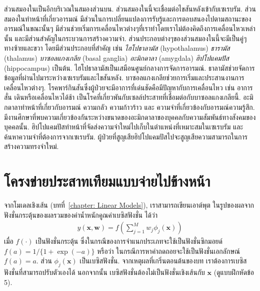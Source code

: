 {\begin{shaded}
ส่วนสมองในเป็นอีกบริเวณในสมองส่วนบน.
ส่วนสมองในนี้จะเชื่อมต่อไขสันหลังเข้ากับเซเรบรัม.
ส่วนสมองในทำหน้าที่เกี่ยวอารมณ์  
มีส่วนในการเปลี่ยนแปลงการรับรู้และการตอบสนองไปตามสถานะของอารมณ์ในขณะนั้นๆ
มีส่วนช่วยเริ่มการเคลื่อนไหวต่างๆที่เราทำโดยเราไม่ต้องคิดถึงการเคลื่อนไหวเหล่านั้น
และมีส่วนสำคัญในกระบวนการสร้างความจำ.
ส่วนประกอบต่างๆของส่วนสมองในนี้จะมีเป็นคู่ๆทางซ้ายและขวา โดยมีส่วนประกอบที่สำคัญ เช่น
\textit{ไฮโปธาลามัส} (hypothalamus)
\textit{ธารามัส} (thalamus)
\textit{บาซอลแกงเกลีย} (basal ganglia)
\textit{อะมิกดาลา} (amygdala)
\textit{ฮิปโปแคมปัส} (hippocampus) เป็นต้น.
ไฮโปธาลามัสเป็นเสมือนศูนย์กลางการจัดการอารมณ์.
ธาลามัสช่วยจัดการข้อมูลที่ผ่านไปมาระหว่างเซเรบรัมและไขสันหลัง.
บาซอลแกงเกลียช่วยการเริ่มและประสานงานการเคลื่อนไหวต่างๆ.
โรคพาร์กินสันซึ่งผู้ป่วยจะมีอาการที่เด่นชัดคือมีปัญหากับการเคลื่อนไหว เช่น อาการสั่น เดินหรือเคลื่อนไหวได้ช้า
เป็นโรคที่เกี่ยวพันกับเซลล์ประสาทที่เชื่อมต่อกับบาซอลแกงเกลียนี้.
อะมิกดาลาทำหน้าที่เกี่ยวกับอารมณ์ ความกลัว ความก้าวร้าว และ ความจำที่เกี่ยวข้องกับอารมณ์ความรู้สึก.
มีงานศึกษาที่พบความเกี่ยวข้องกันระหว่างขนาดของอะมิกดาลาของบุคคลกับความสัมพันธ์ทางสังคมของบุคคลนั้น.
ฮิปโปแคมปัสทำหน้าที่จัดส่งความจำใหม่ไปเก็บในตำแหน่งที่เหมาะสมในเซเรบรัม
และค้นหาความจำที่ต้องการจากเซเรบรัม.
ผู้ป่วยที่สูญเสียฮิปโปแคมปัสไปจะสูญเสียความสามารถในการสร้างความทรงจำใหม่.

\end{shaded}
}%




\section{โครงข่ายประสาทเทียมแบบจ่ายไปข้างหน้า}
\label{sec: ANN structure}



จากโมเดลเชิงเส้น (บทที่~\ref{chapter: Linear Models}),
เราสามารถเขียนเอาต์พุต ในรูปของผลจากฟังชั่นกระตุ้นของผลรวมของค่าน้ำหนักคูณค่าเบซิสฟังชั่น ได้ว่า
\begin{eqnarray}
 y(\mathbf{x}, \mathbf{w}) = f\left( \sum_{j=1}^M w_j \phi_j(\mathbf{x}) \right)
\label{eq: ANN lin model}
\end{eqnarray}
เมื่อ $f(\cdot)$ เป็นฟังชั่นกระตุ้น
ซึ่งในกรณีของการจำแนกประเภทจะใช้เป็นฟังชั่นซิกมอยด์ $f(a) = 1/\{1+ \exp(-a)\}$ 
หรือว่า ในกรณีการหาค่าถดถอยจะใช้เป็นฟังชั่นเอกลักษณ์ $f(a) = a$.
ส่วน $\phi_j(\mathbf{x})$ เป็นเบซิสฟังชั่น.
จากเหตุผลที่เกริ่นตอนต้นของบท เราต้องการเบซิสฟังชั่นที่สามารถปรับตัวเองได้
นอกจากนั้น เบซิสฟังชั่นต้องไม่เป็นฟังชั่นเชิงเส้นกับ $\mathbf{x}$ (ดูแบบฝึกหัดข้อ 5).

